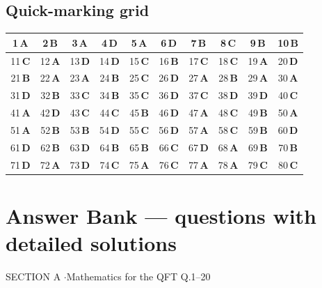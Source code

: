 \documentclass[11pt,a4paper]{article}
\begin{document}
\subsection*{Quick-marking grid}
\begin{center}\renewcommand{\arraystretch}{1.3}
\begin{tabular}{|c|c|c|c|c|c|c|c|c|c|}\hline
1\,\textbf{A} & 2\,\textbf{B} & 3\,\textbf{A} & 4\,\textbf{D} & 5\,\textbf{A} & 6\,\textbf{D} & 7\,\textbf{B} & 8\,\textbf{C} & 9\,\textbf{B} & 10\,\textbf{B} \\
\hline
11\,\textbf{C} & 12\,\textbf{A} & 13\,\textbf{D} & 14\,\textbf{D} & 15\,\textbf{C} & 16\,\textbf{B} & 17\,\textbf{C} & 18\,\textbf{C} & 19\,\textbf{A} & 20\,\textbf{D} \\
\hline
21\,\textbf{B} & 22\,\textbf{A} & 23\,\textbf{A} & 24\,\textbf{B} & 25\,\textbf{C} & 26\,\textbf{D} & 27\,\textbf{A} & 28\,\textbf{B} & 29\,\textbf{A} & 30\,\textbf{A} \\
\hline
31\,\textbf{D} & 32\,\textbf{B} & 33\,\textbf{C} & 34\,\textbf{B} & 35\,\textbf{C} & 36\,\textbf{D} & 37\,\textbf{C} & 38\,\textbf{D} & 39\,\textbf{D} & 40\,\textbf{C} \\
\hline
41\,\textbf{A} & 42\,\textbf{D} & 43\,\textbf{C} & 44\,\textbf{C} & 45\,\textbf{B} & 46\,\textbf{D} & 47\,\textbf{A} & 48\,\textbf{C} & 49\,\textbf{B} & 50\,\textbf{A} \\
\hline
51\,\textbf{A} & 52\,\textbf{B} & 53\,\textbf{B} & 54\,\textbf{D} & 55\,\textbf{C} & 56\,\textbf{D} & 57\,\textbf{A} & 58\,\textbf{C} & 59\,\textbf{B} & 60\,\textbf{D} \\
\hline
61\,\textbf{D} & 62\,\textbf{B} & 63\,\textbf{D} & 64\,\textbf{B} & 65\,\textbf{B} & 66\,\textbf{C} & 67\,\textbf{D} & 68\,\textbf{A} & 69\,\textbf{B} & 70\,\textbf{B} \\
\hline
71\,\textbf{D} & 72\,\textbf{A} & 73\,\textbf{D} & 74\,\textbf{C} & 75\,\textbf{A} & 76\,\textbf{C} & 77\,\textbf{A} & 78\,\textbf{A} & 79\,\textbf{C} & 80\,\textbf{C} \\
\hline\end{tabular}\end{center}
\newpage
\section*{Answer Bank --- questions with detailed solutions}\label{bank}

\begin{sectionbanner}SECTION A \enspace$\cdot$\enspace Mathematics for the QFT \hfill Q.1--20\end{sectionbanner}
\end{document}
